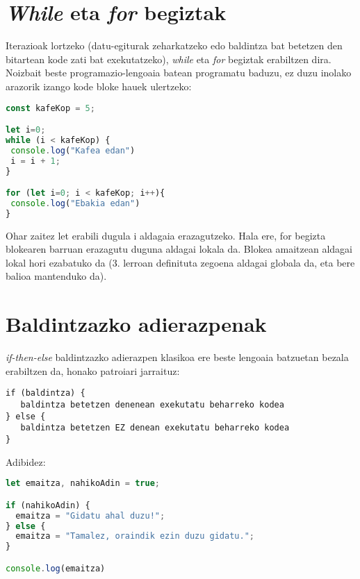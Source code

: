 \section{\textit{While} eta \textit{for} begiztak}

Iterazioak lortzeko (datu-egiturak zeharkatzeko edo baldintza bat betetzen den bitartean kode zati bat exekutatzeko), \textit{while} eta \textit{for} begiztak erabiltzen dira. Noizbait beste programazio-lengoaia batean programatu baduzu, ez duzu inolako arazorik izango kode bloke hauek ulertzeko:

\begin{minipage}{\linewidth}
\begin{lstlisting}[language=JavaScript]
const kafeKop = 5;

let i=0;
while (i < kafeKop) {
 console.log("Kafea edan")
 i = i + 1;
}

for (let i=0; i < kafeKop; i++){
 console.log("Ebakia edan")
}
\end{lstlisting}
\end{minipage}

Ohar zaitez let erabili dugula i aldagaia erazagutzeko. Hala ere, for begizta blokearen barruan erazagutu duguna aldagai lokala da. Blokea amaitzean aldagai lokal hori ezabatuko da (3. lerroan definituta zegoena aldagai globala da, eta bere balioa mantenduko da).

\section{Baldintzazko adierazpenak}
\textit{if-then-else} baldintzazko adierazpen klasikoa ere beste lengoaia batzuetan bezala erabiltzen da, honako patroiari jarraituz:

\begin{verbatim}
if (baldintza) {
   baldintza betetzen denenean exekutatu beharreko kodea
} else {
   baldintza betetzen EZ denean exekutatu beharreko kodea
}
\end{verbatim}

Adibidez:

\begin{minipage}{\linewidth}
\begin{lstlisting}[language=JavaScript]
let emaitza, nahikoAdin = true;

if (nahikoAdin) {
  emaitza = "Gidatu ahal duzu!";
} else {
  emaitza = "Tamalez, oraindik ezin duzu gidatu.";
}

console.log(emaitza)
\end{lstlisting}
\end{minipage}

